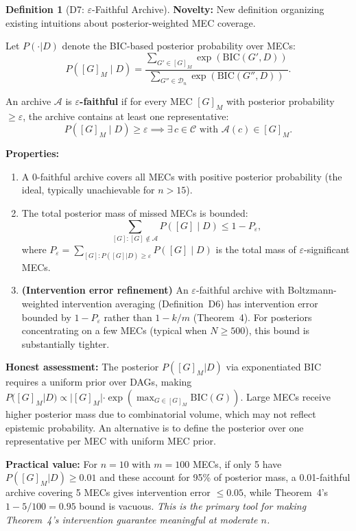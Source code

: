 \documentclass{article}
\theoremstyle{definition}
\newtheorem{definition}{Definition}
\theoremstyle{plain}
\theoremstyle{remark}
\begin{document}
\begin{definition}[D7: $\varepsilon$-Faithful Archive]
\label{def:eps_faithful}
\textbf{Novelty:} New definition organizing existing intuitions about posterior-weighted MEC coverage.

Let $P(\cdot | D)$ denote the BIC-based posterior probability over MECs:
\begin{equation}
P([G]_M \mid D) = \frac{\sum_{G' \in [G]_M} \exp(\mathrm{BIC}(G', D))}
{\sum_{G'' \in \mathcal{D}_n} \exp(\mathrm{BIC}(G'', D))}.
\end{equation}

An archive $\mathcal{A}$ is \textbf{$\varepsilon$-faithful} if for every MEC
$[G]_M$ with posterior probability $\geq \varepsilon$, the archive contains at least
one representative:
\begin{equation}
P([G]_M \mid D) \geq \varepsilon \implies \exists\, c \in \mathcal{C}
\text{ with } \mathcal{A}(c) \in [G]_M.
\end{equation}

\textbf{Properties:}
\begin{enumerate}
  \item[(i)] A $0$-faithful archive covers all MECs with positive posterior
    probability (the ideal, typically unachievable for $n > 15$).
  \item[(ii)] The total posterior mass of missed MECs is bounded:
    \begin{equation}
      \sum_{[G] : [G] \notin \mathcal{A}} P([G] \mid D) \leq 1 - P_\varepsilon,
    \end{equation}
    where $P_\varepsilon = \sum_{[G] : P([G]|D) \geq \varepsilon} P([G] \mid D)$
    is the total mass of $\varepsilon$-significant MECs.
  \item[(iii)] \textbf{(Intervention error refinement)} An $\varepsilon$-faithful archive with Boltzmann-weighted
    intervention averaging (Definition~D6) has intervention error bounded by $1 - P_\varepsilon$
    rather than $1 - k/m$ (Theorem~4). For posteriors concentrating on a few MECs
    (typical when $N \geq 500$), this bound is substantially tighter.
\end{enumerate}

\textbf{Honest assessment:} The posterior $P([G]_M | D)$ via exponentiated BIC
requires a uniform prior over DAGs, making $P([G]_M | D) \propto |[G]_M| \cdot \exp(\max_{G \in [G]_M} \mathrm{BIC}(G))$.
Large MECs receive higher posterior mass due to combinatorial volume, which may not
reflect epistemic probability. An alternative is to define the posterior over
one representative per MEC with uniform MEC prior.

\textbf{Practical value:} For $n = 10$ with $m = 100$ MECs, if only 5 have
$P([G]_M | D) \geq 0.01$ and these account for 95\% of posterior mass, a 0.01-faithful
archive covering 5 MECs gives intervention error $\leq 0.05$, while Theorem~4's
$1 - 5/100 = 0.95$ bound is vacuous. \emph{This is the primary tool for making
Theorem~4's intervention guarantee meaningful at moderate $n$.}
\end{definition}
\end{document}
